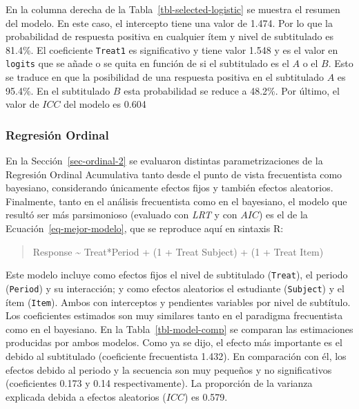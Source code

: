 \documentclass[
  12pt,
  a4paper,
  extrafontsizes,
  onecolumn,
  openright,
  table]{memoir}
\begin{document}
\normalsize

En la columna derecha de la Tabla~\ref{tbl-selected-logistic} se muestra
el resumen del modelo. En este caso, el intercepto tiene una valor de
1.474. Por lo que la probabilidad de respuesta positiva en cualquier
ítem y nivel de subtitulado es 81.4\%. El coeficiente \texttt{Treat1} es
significativo y tiene valor 1.548 y es el valor en \texttt{logits} que
se añade o se quita en función de si el subtitulado es el \(A\) o el
\(B\). Esto se traduce en que la posibilidad de una respuesta positiva
en el subtitulado \(A\) es 95.4\%. En el subtitulado \(B\) esta
probabilidad se reduce a 48.2\%. Por último, el valor de \(ICC\) del
modelo es 0.604

\hypertarget{sec-ordinal-3}{%
\subsubsection{Regresión Ordinal}\label{sec-ordinal-3}}

En la Sección~\ref{sec-ordinal-2} se evaluaron distintas
parametrizaciones de la Regresión Ordinal Acumulativa tanto desde el
punto de vista frecuentista como bayesiano, considerando únicamente
efectos fijos y también efectos aleatorios. Finalmente, tanto en el
análisis frecuentista como en el bayesiano, el modelo que resultó ser
más parsimonioso (evaluado con \emph{\gls{LRT}} y con \(AIC\)) es el de
la Ecuación~\ref{eq-mejor-modelo}, que se reproduce aquí en sintaxis R:

\small

\begin{quote}
Response \textasciitilde{} Treat*Period + (1 + Treat \textbar{} Subject)
+ (1 + Treat \textbar{} Item)
\end{quote}

\normalsize

Este modelo incluye como efectos fijos el nivel de subtitulado
(\texttt{Treat}), el periodo (\texttt{Period}) y su interacción; y como
efectos aleatorios el estudiante (\texttt{Subject}) y el ítem
(\texttt{Item}). Ambos con interceptos y pendientes variables por nivel
de subtítulo. Los coeficientes estimados son muy similares tanto en el
paradigma frecuentista como en el bayesiano. En la
Tabla~\ref{tbl-model-comp} se comparan las estimaciones producidas por
ambos modelos. Como ya se dijo, el efecto más importante es el debido al
subtitulado (coeficiente frecuentista 1.432). En comparación con él, los
efectos debido al periodo y la secuencia son muy pequeños y no
significativos (coeficientes 0.173 y 0.14 respectivamente). La
proporción de la varianza explicada debida a efectos aleatorios
(\(ICC\)) es 0.579.
\end{document}
